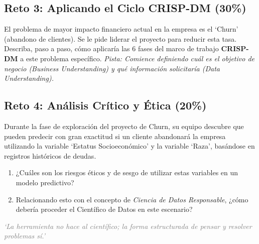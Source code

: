 \documentclass[12pt,a4paper]{article}
\begin{document}
\subsection*{Reto 3: Aplicando el Ciclo CRISP-DM (30\%)}
El problema de mayor impacto financiero actual en la empresa es el `Churn' (abandono de clientes). Se le pide liderar el proyecto para reducir esta tasa.
Describa, paso a paso, cómo aplicaría las 6 fases del marco de trabajo \textbf{CRISP-DM} a este problema específico. 
\textit{Pista: Comience definiendo cuál es el objetivo de negocio (Business Understanding) y qué información solicitaría (Data Understanding).}

\subsection*{Reto 4: Análisis Crítico y Ética (20\%)}
Durante la fase de exploración del proyecto de Churn, su equipo descubre que pueden predecir con gran exactitud si un cliente abandonará la empresa utilizando la variable `Estatus Socioeconómico' y la variable `Raza', basándose en registros históricos de deudas.
\begin{enumerate}
    \item ¿Cuáles son los riesgos éticos y de sesgo de utilizar estas variables en un modelo predictivo?
    \item Relacionando esto con el concepto de \textit{Ciencia de Datos Responsable}, ¿cómo debería proceder el Científico de Datos en este escenario?
\end{enumerate}

\vspace{1cm}
\begin{center}
    \textit{\textcolor{gray}{`La herramienta no hace al científico; la forma estructurada de pensar y resolver problemas sí.'}}
\end{center}
\end{document}
